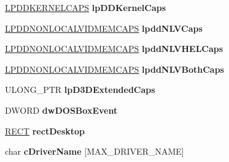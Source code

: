 \begin{DoxyCompactItemize}
\hyperlink{struct___d_d_k_e_r_n_e_l_c_a_p_s}{L\+P\+D\+D\+K\+E\+R\+N\+E\+L\+C\+A\+PS} {\bfseries lp\+D\+D\+Kernel\+Caps}
\item 
\mbox{\label{struct___d_d_r_a_w_i___d_i_r_e_c_t_d_r_a_w___g_b_l_abd7da71785638959563024e8db691089}} 
\hyperlink{struct___d_d_n_o_n_l_o_c_a_l_v_i_d_m_e_m_c_a_p_s}{L\+P\+D\+D\+N\+O\+N\+L\+O\+C\+A\+L\+V\+I\+D\+M\+E\+M\+C\+A\+PS} {\bfseries lpdd\+N\+L\+V\+Caps}
\item 
\mbox{\label{struct___d_d_r_a_w_i___d_i_r_e_c_t_d_r_a_w___g_b_l_a5f7c78bc41d3edbce76aed3474a9863f}} 
\hyperlink{struct___d_d_n_o_n_l_o_c_a_l_v_i_d_m_e_m_c_a_p_s}{L\+P\+D\+D\+N\+O\+N\+L\+O\+C\+A\+L\+V\+I\+D\+M\+E\+M\+C\+A\+PS} {\bfseries lpdd\+N\+L\+V\+H\+E\+L\+Caps}
\item 
\mbox{\label{struct___d_d_r_a_w_i___d_i_r_e_c_t_d_r_a_w___g_b_l_a4d5cd264ccc2baf02652cab32af0315e}} 
\hyperlink{struct___d_d_n_o_n_l_o_c_a_l_v_i_d_m_e_m_c_a_p_s}{L\+P\+D\+D\+N\+O\+N\+L\+O\+C\+A\+L\+V\+I\+D\+M\+E\+M\+C\+A\+PS} {\bfseries lpdd\+N\+L\+V\+Both\+Caps}
\item 
\mbox{\label{struct___d_d_r_a_w_i___d_i_r_e_c_t_d_r_a_w___g_b_l_a639c677630246f76ee89fbe5fa6a40cc}} 
U\+L\+O\+N\+G\+\_\+\+P\+TR {\bfseries lp\+D3\+D\+Extended\+Caps}
\item 
\mbox{\label{struct___d_d_r_a_w_i___d_i_r_e_c_t_d_r_a_w___g_b_l_a953baaca9467d605e07fa20b6a4030e1}} 
D\+W\+O\+RD {\bfseries dw\+D\+O\+S\+Box\+Event}
\item 
\mbox{\label{struct___d_d_r_a_w_i___d_i_r_e_c_t_d_r_a_w___g_b_l_a6ca03b8a7a48a742278ed79d509ef0bb}} 
\hyperlink{structtag_r_e_c_t}{R\+E\+CT} {\bfseries rect\+Desktop}
\item 
\mbox{\label{struct___d_d_r_a_w_i___d_i_r_e_c_t_d_r_a_w___g_b_l_a6eafcef45842ac31265c7463c724b2dd}} 
char {\bfseries c\+Driver\+Name} \mbox{[}M\+A\+X\+\_\+\+D\+R\+I\+V\+E\+R\+\_\+\+N\+A\+ME\mbox{]}

\end{DoxyCompactItemize}
